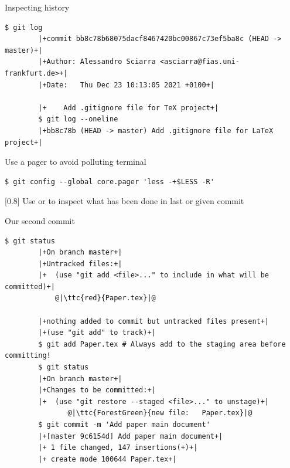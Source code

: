 \documentclass[usenames,svgnames,14pt]{beamer}
\newcommand{\ttc}[2]{\texttt{\textcolor{#1}{#2}}}
\begin{document}
\begin{frame}[fragile]{Inspecting history}
    \begin{lstlisting}[style=MyBash, belowskip=-4mm]
        $ git log
        |+commit bb8c78b68075dacf8467420bc00867c73ef5ba8c (HEAD -> master)+|
        |+Author: Alessandro Sciarra <asciarra@fias.uni-frankfurt.de>+|
        |+Date:   Thu Dec 23 10:13:05 2021 +0100+|

        |+    Add .gitignore file for TeX project+|
        $ git log --oneline
        |+bb8c78b (HEAD -> master) Add .gitignore file for LaTeX project+|
    \end{lstlisting}
    \centerline{Use a pager to avoid polluting terminal}
    \begin{lstlisting}[style=MyBash, aboveskip=2mm]
        $ git config --global core.pager 'less -+$LESS -R'
    \end{lstlisting}
    \medskip
    \begin{varblock}{}[0.8\textwidth]{}
        Use \;\; or \;\; to inspect what has been done in last or given commit
    \end{varblock}
\end{frame}
\begin{frame}[fragile]{Our second commit}
    \begin{lstlisting}[style=MyBash]
        $ git status
        |+On branch master+|
        |+Untracked files:+|
        |+  (use "git add <file>..." to include in what will be committed)+|
            @|\ttc{red}{Paper.tex}|@

        |+nothing added to commit but untracked files present+|
        |+(use "git add" to track)+|
        $ git add Paper.tex # Always add to the staging area before committing!
        $ git status 
        |+On branch master+|
        |+Changes to be committed:+|
        |+  (use "git restore --staged <file>..." to unstage)+|
               @|\ttc{ForestGreen}{new file:   Paper.tex}|@
        $ git commit -m 'Add paper main document'
        |+[master 9c6154d] Add paper main document+|
        |+ 1 file changed, 147 insertions(+)+|
        |+ create mode 100644 Paper.tex+|
    \end{lstlisting}
\end{frame}
\end{document}
